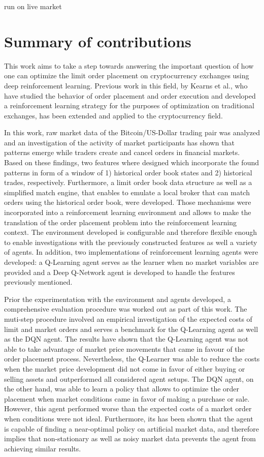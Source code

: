 run on live market

\section{Summary of contributions}

This work aims to take a step towards answering the important question of how one can optimize the limit order placement on cryptocurrency exchanges using deep reinforcement learning.
Previous work in this field, by Kearns et al., who have studied the behavior of order placement and order execution\cite{nevmyvaka2005electronic} and developed a reinforcement learning strategy\cite{nevmyvaka2006reinforcement} for the purposes of optimization on traditional exchanges, has been extended and applied to the cryptocurrency field.

In this work, raw market data of the Bitcoin/US-Dollar trading pair was analyzed and an investigation of the activity of market participants has shown that patterns emerge while traders create and cancel orders in financial markets.
Based on these findings, two features where designed which incorporate the found patterns in form of a window of 1) historical order book states and 2) historical trades, respectively.
Furthermore, a limit order book data structure as well as a simplified match engine, that enables to emulate a local broker that can match orders using the historical order book, were developed.
Those mechanisms were incorporated into a reinforcement learning environment and allows to make the translation of the order placement problem into the reinforcement learning context.
The environment developed is configurable and therefore flexible enough to enable investigations with the previously constructed features as well a variety of agents.
In addition, two implementations of reinforcement learning agents were developed: a Q-Learning agent serves as the learner when no market variables are provided and a Deep Q-Network agent is developed to handle the features previously mentioned.

Prior the experimentation with the environment and agents developed, a comprehensive evaluation procedure was worked out as part of this work.
The muti-step procedure involved an empirical investigation of the expected costs of limit and market orders and serves a benchmark for the Q-Learning agent as well as the DQN agent.
The results have shown that the Q-Learning agent was not able to take advantage of market price movements that came in favour of the order placement process.
Nevertheless, the Q-Learner was able to reduce the costs when the market price development did not come in favor of either buying or selling assets and outperformed all considered agent setups.
The DQN agent, on the other hand, was able to learn a policy that allows to optimize the order placement when market conditions came in favor of making a purchase or sale.
However, this agent performed worse than the expected costs of a market order when conditions were not ideal.
Furthermore, its has been shown that the agent is capable of finding a near-optimal policy on artificial market data, and therefore implies that non-stationary as well as noisy market data prevents the agent from achieving similar results.

